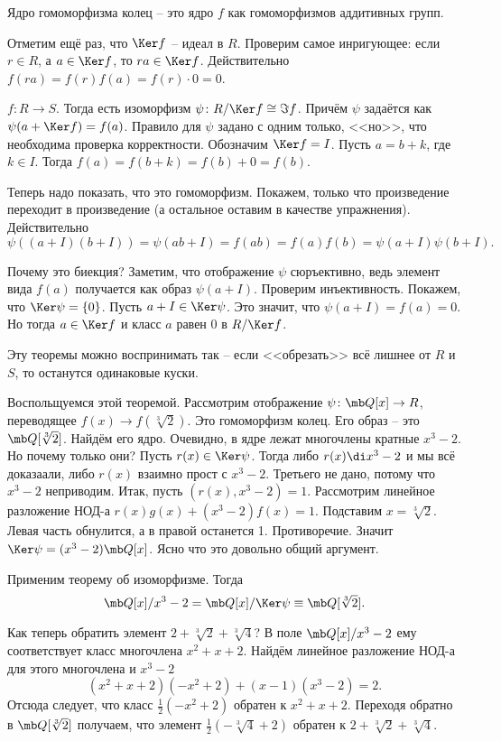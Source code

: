 \rm Ядро гомоморфизма колец -- это ядро $f$ как гомоморфизмов аддитивных групп.
\erm

\rm Отметим ещё раз, что $\Ker f$ -- идеал в $R$. Проверим самое инригующее: если $r\in R$, а $a\in \Ker f$, то $ra \in \Ker f$. Действительно $f(ra)=f(r)f(a)=f(r)\cdot 0=0$.
\erm 



 $f\colon R \to S$. Тогда есть изоморфизм $\psi \colon R/\Ker f \cong \Im f$. Причём $\psi$ задаётся как $\psi(a+\Ker f)=f(a)$. 
\ethrm
\proof Правило для $\psi$ задано с одним только, <<но>>, что необходима проверка корректности. Обозначим $\Ker f=I$. Пусть $a=b+k$, где $k\in I$. Тогда $f(a)=f(b+k)=f(b)+0=f(b)$.

Теперь надо показать, что это гомоморфизм. Покажем, только что произведение переходит в произведение (а остальное оставим в качестве упражнения). Действительно
$$\psi((a+I)(b+I))=\psi(ab+I)= f(ab)=f(a)f(b)=\psi(a+I)\psi(b+I).$$

Почему это биекция? Заметим, что отображение $\psi$ сюръективно, ведь элемент вида $f(a)$ получается как образ $\psi(a+I)$. Проверим инъективность. Покажем, что $\Ker \psi =\{0\}$. 
Пусть $a+I\in \Ker \psi$. Это значит, что $\psi(a+I)=f(a)=0$. Но тогда $a\in \Ker f$ и класс $a$ равен $0$ в $R/\Ker f$. 
\endproof

Эту теоремы можно воспринимать так -- если <<обрезать>> всё лишнее от $R$ и $S$, то останутся одинаковые куски.  

Воспольщуемся этой теоремой. Рассмотрим отображение $\psi \colon \mb Q[x] \to R$, переводящее $f(x) \to f(\sqrt[3]{2})$. Это гомоморфизм колец. Его образ -- это $\mb Q[\sqrt[3]{2}]$. Найдём его ядро. Очевидно, в ядре лежат многочлены кратные $x^3-2$. Но почему только они? Пусть $r(x)\in \Ker \psi$. Тогда либо $r(x)\di x^3-2$ и мы всё доказаали, либо $r(x)$ взаимно прост с $x^3-2$. Третьего не дано, потому что $x^3-2$ неприводим. Итак, пусть $(r(x),x^3-2)=1$. Рассмотрим линейное разложение НОД-а $r(x)g(x)+(x^3-2)f(x)=1$. Подставим $x=\sqrt[3]{2}$. Левая часть обнулится, а в правой останется 1. Противоречие. Значит $\Ker \psi = (x^3-2)\mb Q[x]$. Ясно что это довольно общий аргумент. 

Применим теорему об изоморфизме. Тогда $$\mb Q[x]/x^3-2= \mb Q[x]/\Ker \psi \equiv \mb Q[\sqrt[3]{2}].$$

Как теперь обратить элемент $2+\sqrt[3]{2} + \sqrt[3]{4}$? В поле  $\mb Q[x]/x^3-2$ ему соответствует класс многочлена $x^2+x+2$. Найдём линейное разложение НОД-а для этого многочлена и $x^3-2$ 
$$(x^2+x+2)(-x^2+2)+(x-1)(x^3-2)=2.$$
Отсюда следует, что класс $\frac{1}{2}(-x^2+2)$ обратен к $x^2+x+2$. Переходя обратно в $\mb Q[\sqrt[3]{2}]$ получаем, что элемент $\frac{1}{2}(-\sqrt[3]{4}+2)$ обратен к $2+\sqrt[3]{2} + \sqrt[3]{4}$.

